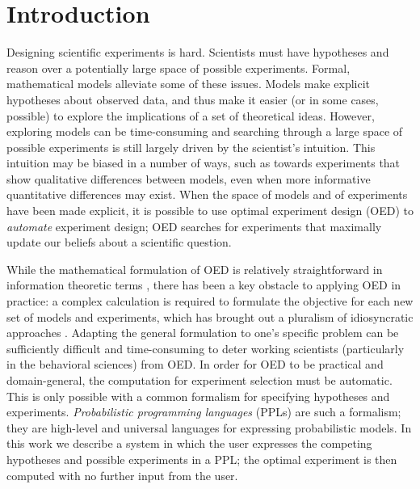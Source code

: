 \documentclass{article}
\newcommand{\ndg}[1]{\textcolor{Green}{[ndg: #1]}}
\newcommand{\lou}[1]{\textcolor{orange}{[lou: #1]}}
\begin{document}
\section{Introduction}
Designing scientific experiments is hard.
Scientists must have hypotheses and reason over a potentially large space of possible experiments.
Formal, mathematical models alleviate some of these issues.
Models make explicit hypotheses about observed data, and thus make it easier (or in some cases, possible) to explore the implications of a set of theoretical ideas.
However, exploring models can be time-consuming and searching through a large space of possible experiments is still largely driven by the scientist's intuition.
This intuition may be biased in a number of ways, such as towards experiments that show qualitative differences between models, even when more informative quantitative differences may exist.
When the space of models and of experiments have been made explicit, it is possible to use optimal experiment design (OED) to \emph{automate} experiment design; OED searches for experiments that maximally update our beliefs about a scientific question.

While the mathematical formulation of OED is relatively straightforward in information theoretic terms \cite{Lindley1956}, there has been a key obstacle to applying OED in practice: a complex calculation is required to formulate the objective for each new set of models and experiments, which has brought out a pluralism of idiosyncratic approaches \cite{Chaloner1995}.
Adapting the general formulation to one's specific problem can be sufficiently difficult and time-consuming to deter working scientists (particularly in the behavioral sciences) from OED.
In order for OED to be practical and domain-general, the computation for experiment selection must be automatic.
This is only possible with a common formalism for specifying hypotheses and experiments.
\emph{Probabilistic programming languages} (PPLs) are such a formalism; they are high-level and universal languages for expressing probabilistic models.
In this work we describe a system in which the user expresses the competing hypotheses and possible experiments in a PPL; the optimal experiment is then computed with no further input from the user.
\end{document}
